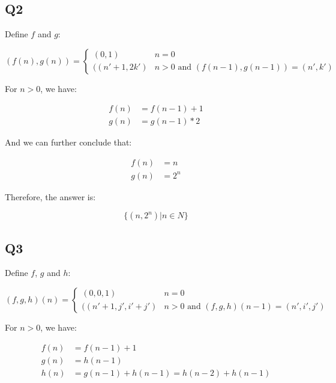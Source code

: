 \documentclass[11pt,a4paper]{article}
\begin{document}
\subsection{Q2}

Define $f$ and $g$:

\begin{equation*}
    (f(n), g(n)) =
    \begin{cases}
        (0,1) & n = 0 \\
        ((n'+1, 2k') & n > 0 \text{ and } (f(n-1),g(n-1)) = (n',k')
    \end{cases}
\end{equation*}

For $n > 0$, we have:

\begin{align*}
    f(n) & = f(n-1) + 1 \\
    g(n) & = g(n-1) * 2 
\end{align*}

And we can further conclude that:

\begin{align*}
    f(n) & = n \\
    g(n) & = 2^n 
\end{align*}

Therefore, the answer is:

\begin{equation*}
    \{ (n,2^n) | n \in N \}
\end{equation*}

\subsection{Q3}

Define $f$, $g$ and $h$:

\begin{equation*}
    (f, g, h)(n) =
    \begin{cases}
        (0,0,1) & n = 0 \\
        ((n'+1, j', i'+j') & n > 0 \text{ and }
            (f,g,h)(n-1) = (n',i',j')
    \end{cases}
\end{equation*}

For $n > 0$, we have:

\begin{align*}
    f(n) & = f(n-1) + 1 \\
    g(n) & = h(n-1) \\
    h(n) & = g(n-1) + h(n-1) = h(n-2) + h(n-1)
\end{align*}
\end{document}
